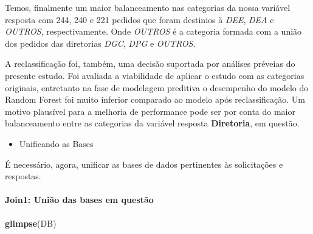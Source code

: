 \documentclass[]{article}
\newenvironment{Shaded}{\begin{snugshade}}{\end{snugshade}}
\newcommand{\CommentTok}[1]{\textcolor[rgb]{0.56,0.35,0.01}{\textit{#1}}}
\newcommand{\DataTypeTok}[1]{\textcolor[rgb]{0.13,0.29,0.53}{#1}}
\newcommand{\KeywordTok}[1]{\textcolor[rgb]{0.13,0.29,0.53}{\textbf{#1}}}
\newcommand{\NormalTok}[1]{#1}
\newcommand{\OperatorTok}[1]{\textcolor[rgb]{0.81,0.36,0.00}{\textbf{#1}}}
\newcommand{\StringTok}[1]{\textcolor[rgb]{0.31,0.60,0.02}{#1}}
\providecommand{\tightlist}{%
  \setlength{\itemsep}{0pt}\setlength{\parskip}{0pt}}
\let\oldparagraph\paragraph
\renewcommand{\paragraph}[1]{\oldparagraph{#1}\mbox{}}
\begin{document}
Temos, finalmente um maior balanceamento nas categorias da nossa
variável resposta com 244, 240 e 221 pedidos que foram destinios à
\emph{DEE}, \emph{DEA} e \emph{OUTROS}, respectivamente. Onde
\emph{OUTROS} é a categoria formada com a união dos pedidos das
diretorias \emph{DGC}, \emph{DPG} e \emph{OUTROS}.

A reclassificação foi, também, uma decisão suportada por análises
préveias do presente estudo. Foi avaliada a viabilidade de aplicar o
estudo com as categorias originais, entretanto na fase de modelagem
preditiva o desempenho do modelo do Random Forest foi muito inferior
comparado ao modelo após reclassificação. Um motivo plausível para a
melhoria de performance pode ser por conta do maior balanceamento entre
as categorias da variável resposta \textbf{Diretoria}, em questão.

\begin{itemize}
\tightlist
\item
  Unificando as Bases
\end{itemize}

É necessário, agora, unificar as bases de dados pertinentes às
solicitações e respostas.

\hypertarget{join1-uniao-das-bases-em-questao}{%
\paragraph{Join1: União das bases em
questão}\label{join1-uniao-das-bases-em-questao}}

\begin{Shaded}
\end{Shaded}

\begin{Shaded}
\begin{Highlighting}[]
\KeywordTok{glimpse}\NormalTok{(DB)}
\end{Highlighting}
\end{Shaded}
\end{document}
